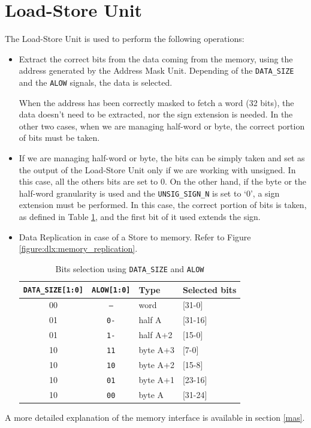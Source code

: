 \section{Load-Store Unit}
\label{sec:ldstr}
The Load-Store Unit is used to perform the following operations:
\begin{itemize}
    \item Extract the correct bits from the data coming from the memory, using the address generated by the Address Mask Unit. Depending of the \texttt{DATA\_SIZE} and the \texttt{ALOW} signals, the data is selected.
    
    When the address has been correctly masked to fetch a word (32 bits), the data doesn't need to be extracted, nor the sign extension is needed. In the other two cases, when we are managing half-word or byte, the correct portion of bits must be taken. 

    \item If we are managing half-word or byte, the bits can be simply taken and set as the output of the Load-Store Unit only if we are working with unsigned. In this case, all the others bits are set to 0. On the other hand, if the byte or the half-word granularity is used and the \texttt{UNSIG\_SIGN\_N} is set to `0', a sign extension must be performed. In this case, the correct portion of bits is taken, as defined in Table \ref{tab:addr_selection}, and the first bit of it used extends the sign.

    \item Data Replication in case of a Store to memory. Refer to Figure \ref{figure:dlx:memory_replication}.  


    \begin{table}[H]
        \begin{center}
            \begin{tabular}{ |c| c | l | l|}
                \hline
                \texttt{DATA\_SIZE[1:0]} & \texttt{ALOW[1:0]} & \textbf{Type} & \textbf{Selected bits}\\
                \hline
                00 & \texttt{--} & word & [31-0]\\
                01 & \texttt{0-} & half A & [31-16]\\
                01 & \texttt{1-} & half A+2 & [15-0]\\
                10 & \texttt{11} & byte A+3 & [7-0]\\
                10 & \texttt{10} & byte A+2 & [15-8]\\
                10 & \texttt{01} & byte A+1 & [23-16]\\
                10 & \texttt{00} & byte A & [31-24]\\
                \hline
                
            \end{tabular}
            \caption{Bits selection using \texttt{DATA\_SIZE} and \texttt{ALOW}}
            \label{tab:addr_selection}
        \end{center}
    \end{table}

    
\end{itemize}
A more detailed explanation of the memory interface is available in section \ref{mas}.